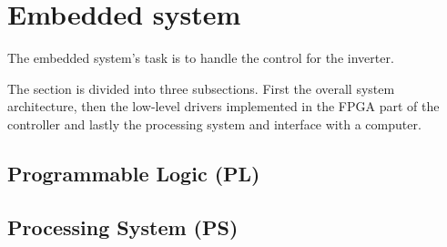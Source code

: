 
\section{Embedded system}
The embedded system's task is to handle the control for the inverter.

The section is divided into three subsections. First the overall system architecture, then the low-level drivers implemented in the FPGA part of the controller and lastly the processing system and interface with a computer. 






\subsection{Programmable Logic (PL)}






\subsection{Processing System (PS)}












